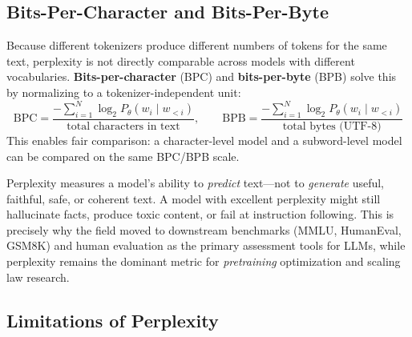 \subsection{Bits-Per-Character and Bits-Per-Byte}
\label{sec:bpc}

Because different tokenizers produce different numbers of tokens for the same
text, perplexity is not directly comparable across models with different
vocabularies.  \textbf{Bits-per-character} (BPC) and \textbf{bits-per-byte}
(BPB) solve this by normalizing to a tokenizer-independent unit:
\[
    \text{BPC} = \frac{-\sum_{i=1}^{N}\log_2 P_\theta(w_i \mid w_{<i})}{\text{total characters in text}}, \qquad
    \text{BPB} = \frac{-\sum_{i=1}^{N}\log_2 P_\theta(w_i \mid w_{<i})}{\text{total bytes (UTF-8)}}
\]
This enables fair comparison: a character-level model and a subword-level model
can be compared on the same BPC/BPB scale.

\begin{keyinsight}
Perplexity measures a model's ability to \emph{predict} text---not to
\emph{generate} useful, faithful, safe, or coherent text.  A model with
excellent perplexity might still hallucinate facts, produce toxic content, or
fail at instruction following.  This is precisely why the field moved to
downstream benchmarks (MMLU, HumanEval, GSM8K) and human evaluation as the
primary assessment tools for LLMs, while perplexity remains the dominant metric
for \emph{pretraining} optimization and scaling law research.
\end{keyinsight}

\subsection{Limitations of Perplexity}

